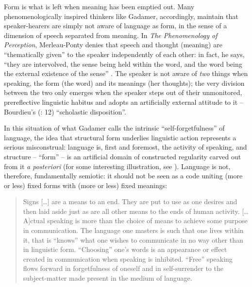 \documentclass[output=paper]{langscibook}
\begin{document}
Form is what is left when meaning has been emptied out. Many phenomenologically inspired thinkers like Gadamer, accordingly, maintain that speaker-hearers are simply not aware of language as form, in the sense of a dimension of speech separated from meaning. In \emph{The Phenomenology of Perception}, Merleau-Ponty denies that speech and thought (meaning) are ``thematically given'' to the speaker independently of each other: in fact, he says, ``they are intervolved, the sense being held within the word, and the word being the external existence of the sense'' \citep[182]{Merleau-Ponty19621945}. The speaker is not aware of \emph{two} things when speaking, the form (the word) and its meanings (her thoughts); the very division between the two only emerges when the speaker steps out of their unmonitored, prereflective linguistic habitus and adopts an artificially external attitude to it – Bourdieu's (\citeyear{Bourdieu20031997}: 12) ``scholastic disposition''.

In this situation of what Gadamer calls the intrinsic ``self-forgetfulness'' of language, the idea that structural form underlies linguistic action represents a serious misconstrual: language is, first and foremost, the activity of speaking, and structure – ``form'' – is an artificial domain of constructed regularity carved out from it \emph{a posteriori} (for some interesting illustration, see \citealt{Preston1996}). Language is not, therefore, fundamentally semiotic: it should not be seen as a code uniting (more or less) fixed forms with (more or less) fixed meanings:

\begin{quotation}
Signs […] are a means to an end. They are put to use as one desires and then laid aside just as are all other means to the ends of human activity. [… A]ctual speaking is more than the choice of means to achieve some purpose in communication.  The language one masters is such that one lives within it, that is ``knows'' what one wishes to communicate in no way other than in linguistic form. ``Choosing'' one's words is an appearance or effect created in communication when speaking is inhibited. ``Free'' speaking flows forward in forgetfulness of oneself and in self-surrender to the subject-matter made present in the medium of language. \citep[87]{Gadamer19761972}
\end{quotation}
\end{document}
